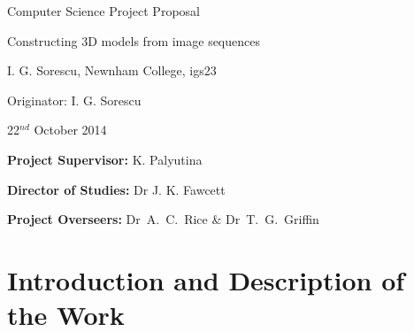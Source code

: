 
\vfil

\centerline{\Large Computer Science Project Proposal}
\vspace{0.4in}
\centerline{\Large Constructing 3D models from image sequences}
\vspace{0.4in}
\centerline{\large I. G. Sorescu, Newnham College, igs23}
\vspace{0.3in}
\centerline{\large Originator: I. G. Sorescu}
\vspace{0.3in}
\centerline{\large 22$^{nd}$ October 2014}

\vfil


\noindent
{\bf Project Supervisor:} K. Palyutina
\vspace{0.2in}

\noindent
{\bf Director of Studies:} Dr J. K. Fawcett
\vspace{0.2in}
\noindent
 
\noindent
{\bf Project Overseers:} Dr~A.~C.~Rice  \& Dr~T.~G.~Griffin



\section*{Introduction and Description of the Work}

